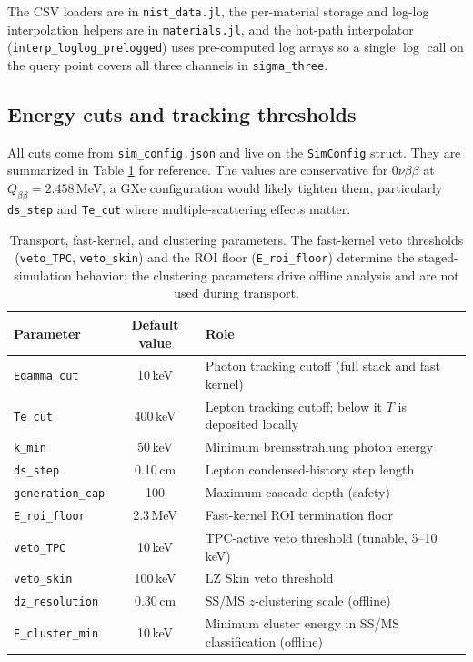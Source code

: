 \documentclass[11pt]{article}
\begin{document}
The CSV loaders are in \texttt{nist\_data.jl}, the per-material storage and
log-log interpolation helpers are in \texttt{materials.jl}, and the
hot-path interpolator
(\texttt{interp\_loglog\_prelogged}) uses pre-computed log arrays so a single
$\log$ call on the query point covers all three channels in
\texttt{sigma\_three}.

\subsection{Energy cuts and tracking thresholds}
\label{sec:physics-cuts}

All cuts come from \texttt{sim\_config.json} and live on the \texttt{SimConfig}
struct. They are summarized in Table \ref{tab:cuts} for reference. The values
are conservative for $0\nu\beta\beta$ at $Q_{\beta\beta} = 2.458$\,MeV; a
GXe configuration would likely tighten them, particularly \texttt{ds\_step}
and \texttt{Te\_cut} where multiple-scattering effects matter.

\begin{table}[h]
\centering
\begin{tabular}{lcl}
\toprule
Parameter & Default value & Role \\
\midrule
\texttt{Egamma\_cut}  & 10\,keV   & Photon tracking cutoff (full stack and fast kernel) \\
\texttt{Te\_cut}      & 400\,keV  & Lepton tracking cutoff; below it $T$ is deposited locally \\
\texttt{k\_min}       & 50\,keV   & Minimum bremsstrahlung photon energy \\
\texttt{ds\_step}     & 0.10\,cm  & Lepton condensed-history step length \\
\texttt{generation\_cap} & 100   & Maximum cascade depth (safety) \\
\texttt{E\_roi\_floor} & 2.3\,MeV & Fast-kernel ROI termination floor \\
\texttt{veto\_TPC}    & 10\,keV   & TPC-active veto threshold (tunable, 5--10\,keV) \\
\texttt{veto\_skin}   & 100\,keV  & LZ Skin veto threshold \\
\texttt{dz\_resolution} & 0.30\,cm & SS/MS $z$-clustering scale (offline) \\
\texttt{E\_cluster\_min} & 10\,keV & Minimum cluster energy in SS/MS classification (offline) \\
\bottomrule
\end{tabular}
\caption{Transport, fast-kernel, and clustering parameters. The fast-kernel
veto thresholds (\texttt{veto\_TPC}, \texttt{veto\_skin}) and the ROI floor
(\texttt{E\_roi\_floor}) determine the staged-simulation behavior; the
clustering parameters drive offline analysis and are not used during
transport.}
\label{tab:cuts}
\end{table}
\end{document}
